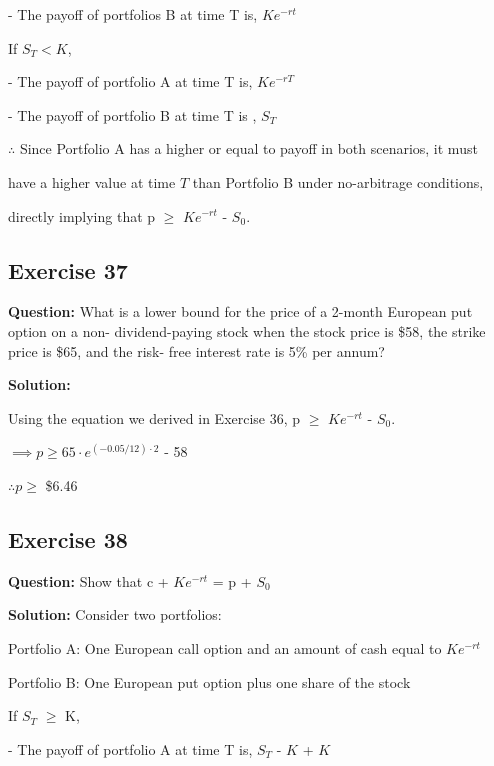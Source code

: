 \documentclass{article}
\begin{document}
- The payoff of portfolios B at time T is, $Ke^{-rt}$

If \( S_T < K \),

- The payoff of portfolio A at time T is, \( Ke^{-rT} \)

- The payoff of portfolio B at time T is , \( S_T \)

\vspace{\baselineskip}

$\therefore$ Since Portfolio A has a higher or equal to  payoff in both scenarios, it must 

have a higher value at time \( T \) than Portfolio B under no-arbitrage conditions, 

directly implying that p $\geq$ $Ke^{-rt}$ - $S_{0}$.

\subsection*{Exercise 37}

\textbf{Question:} What is a lower bound for the price of a 2-month European put option on a non- dividend-paying
stock when the stock price is \$58, the strike price is \$65, and the risk- free interest rate is 5\% per annum?
 
\textbf{Solution:}

Using the equation we derived in Exercise 36, p $\geq$ $Ke^{-rt}$ - $S_{0}$.

$\implies p \geq 65 \cdot e^{(-0.05/12) \cdot 2}$ - 58

$\therefore p \geq $ \$6.46

\subsection*{Exercise 38}

\textbf{Question:} Show that c + $Ke^{-rt}$ = p + $S_0$
 
\textbf{Solution:}
Consider two portfolios:

\vspace{\baselineskip}

Portfolio A: One European call option and an amount of cash equal to $Ke^{-rt}$

Portfolio B: One European put option plus one share of the stock 

\vspace{\baselineskip}

If $S_T$ $\geq$ K,

- The payoff of portfolio A at time T is, $S_T$ - $K$ + $K$
\end{document}
